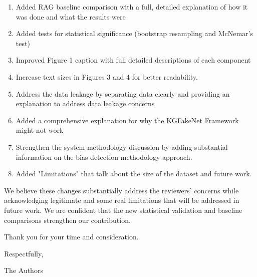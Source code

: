\documentclass[11pt]{article}
\begin{document}
\begin{enumerate}
    \item Added  RAG baseline comparison with a full, detailed explanation of how it was done and what the results were

    \item Added tests for statistical significance (bootstrap resampling and McNemar's test)

    \item  Improved  Figure 1 caption with full detailed descriptions of each component

    \item Increase text sizes in Figures 3 and 4 for better readability.

    \item Address the data leakage by  separating data clearly and providing an explanation to address data leakage concerns

    \item  Added a comprehensive  explanation for why the KGFakeNet Framework might not work

    \item Strengthen the system methodology discussion by adding substantial information on the bias detection methodology approach. 

    \item Added  "Limitations" that talk about the size of the dataset and future work.

\end{enumerate}

\vspace{1em}

We believe these changes substantially address the reviewers' concerns while acknowledging legitimate and some real limitations that will be addressed in future work. We are confident that the new statistical validation and baseline comparisons strengthen our contribution.

\vspace{1em}

Thank you for your time and consideration.

\vspace{1em}

\noindent Respectfully,


\noindent The Authors
\end{document}
